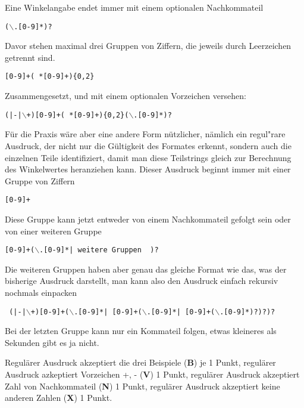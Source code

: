 \begin{loesung}
Eine Winkelangabe endet immer mit einem optionalen Nachkommateil
\begin{center}
\tt($\backslash$.[0-9]*)?
\end{center}
Davor stehen maximal drei Gruppen von Ziffern, die jeweils durch
Leerzeichen getrennt sind.
\begin{center}
\tt[0-9]+( *[0-9]+)\{0,2\}
\end{center}
Zusammengesetzt, und mit einem optionalen Vorzeichen versehen:
\begin{center}
\tt (|-|$\backslash$+)[0-9]+( *[0-9]+)\{0,2\}($\backslash$.[0-9]*)?
\end{center}

Für die Praxis wäre aber eine andere Form nützlicher, nämlich ein
regul"rare Ausdruck, der nicht nur die Gültigkeit des Formates
erkennt, sondern auch die einzelnen Teile identifiziert, damit man
diese Teilstrings gleich zur Berechnung des Winkelwertes heranziehen
kann. Dieser Ausdruck beginnt immer mit einer Gruppe von Ziffern
\begin{center}
\tt [0-9]+
\end{center}
Diese Gruppe kann jetzt entweder von einem Nachkommateil gefolgt sein
oder von einer weiteren Gruppe
\begin{center}
\tt [0-9]+($\backslash$.[0-9]*| {\rm weitere Gruppen } )?
\end{center}
Die weiteren Gruppen haben aber genau das gleiche Format wie das,
was der bisherige Ausdruck darstellt, man kann also den Ausdruck einfach
rekursiv nochmals einpacken
\begin{center}
\tt
(|-|$\backslash$+)[0-9]+($\backslash$.[0-9]*| [0-9]+($\backslash$.[0-9]*| [0-9]+($\backslash$.[0-9]*)?)?)?
\end{center}
Bei der letzten Gruppe kann nur ein Kommateil folgen, etwas kleineres
als Sekunden gibt es ja nicht.
\end{loesung}

\begin{bewertung}
Regulärer Ausdruck akzeptiert die drei Beispiele ({\bf B}) je 1 Punkt,
regulärer Ausdruck azkeptiert Vorzeichen +, - ({\bf V}) 1 Punkt,
regulärer Ausdruck akzeptiert Zahl von Nachkommateil ({\bf N}) 1 Punkt,
regulärer Ausdruck akzeptiert keine anderen Zahlen ({\bf X}) 1 Punkt.
\end{bewertung}

